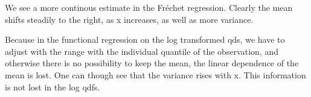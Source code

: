 We see a more continous estimate in the Fréchet regression. Clearly the mean shifts
steadily to the right, as x increases, as well as more variance.

Because in the functional regression on the log transformed qds, we have to adjust with
the range with the individual quantile of the observation, and otherwise there is no
possibility to keep the mean, the linear dependence of the mean is lost. One can though
see that the variance rises with x. This information is not lost in the log qdfs.

